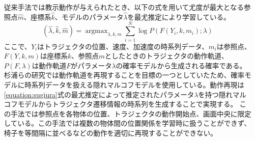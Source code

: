 従来手法では教示動作が与えられたとき、以下の式を用いて尤度が最大となる参照点$\hat{m}$、座標系$\hat{k}$、モデルのパラメータ$\hat{λ}$を最尤推定により学習している。
\begin{equation}
	\label{equation:sugiura}
	(\hat{λ} , \hat{k} , \hat{m}) = \mathop{\arg\max}_{λ , k , m}\sum_{i=1}^{N}\log P(F(Y_{i} , k , m_{i}) ; λ)
\end{equation}
ここで、$Y_{i}$はトラジェクタの位置、速度、加速度の時系列データ、$m_{i}$は参照点、$F(Y , k , m)$は座標系$k$、参照点$m$としたときのトラジェクタの動作軌道、$P(F,λ)$は動作軌道$F$がパラメータ$λ$の確率モデルから生成される確率である。杉浦らの研究では動作軌道を再現することを目標の一つとしていたため、確率モデルに時系列データを扱える隠れマルコフモデルを使用している。動作再現は\ref{equation:sugiura}式の最尤推定によって推定されたパラメータ$λ$を持つ隠れマルコフモデルからトラジェクタ遷移情報の時系列を生成することで実現する。
この手法では参照点を各物体の位置、トラジェクタの動作開始点、画面中央に限定している。この手法では複数の物体間の位置関係を学習時に扱うことができず、椅子を等間隔に並べるなどの動作を適切に再現することができない。